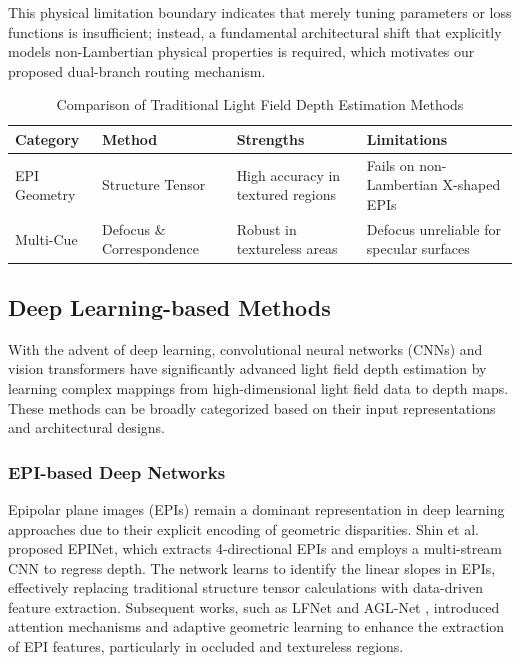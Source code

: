 \documentclass[lettersize,journal]{IEEEtran}
\begin{document}
This physical limitation boundary indicates that merely tuning parameters or loss functions is insufficient; instead, a fundamental architectural shift that explicitly models non-Lambertian physical properties is required, which motivates our proposed dual-branch routing mechanism.

\begin{table}[!t]
\centering
\caption{Comparison of Traditional Light Field Depth Estimation Methods}
\label{tab:traditional_methods}
\begin{tabular}{@{}llll@{}}
\toprule
\textbf{Category} & \textbf{Method} & \textbf{Strengths} & \textbf{Limitations} \\ \midrule
EPI Geometry & Structure Tensor \cite{wanner2012globally} & High accuracy in textured regions & Fails on non-Lambertian X-shaped EPIs \\
Multi-Cue & Defocus \& Correspondence \cite{tao2013depth} & Robust in textureless areas & Defocus unreliable for specular surfaces \\ \bottomrule
\end{tabular}
\end{table}

\subsection{Deep Learning-based Methods}

With the advent of deep learning, convolutional neural networks (CNNs) and vision transformers have significantly advanced light field depth estimation by learning complex mappings from high-dimensional light field data to depth maps. These methods can be broadly categorized based on their input representations and architectural designs.

\subsubsection{EPI-based Deep Networks}
Epipolar plane images (EPIs) remain a dominant representation in deep learning approaches due to their explicit encoding of geometric disparities. Shin et al.\ \cite{shin2018epinet} proposed EPINet, which extracts 4-directional EPIs and employs a multi-stream CNN to regress depth. The network learns to identify the linear slopes in EPIs, effectively replacing traditional structure tensor calculations with data-driven feature extraction. Subsequent works, such as LFNet \cite{liang2020lfnet} and AGL-Net \cite{wang2021agl}, introduced attention mechanisms and adaptive geometric learning to enhance the extraction of EPI features, particularly in occluded and textureless regions.
\end{document}
